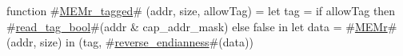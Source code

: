 function #\hyperref[sailMIPSzMEMrzytagged]{MEMr\_tagged}# (addr, size, allowTag) =
{
  let tag  = if allowTag then #\hyperref[sailMIPSzreadzytagzybool]{read\_tag\_bool}#(addr & cap_addr_mask) else false in
  let data = #\hyperref[sailMIPSzMEMr]{MEMr}#(addr, size) in
  (tag, #\hyperref[sailMIPSzreversezyendianness]{reverse\_endianness}#(data))
}
